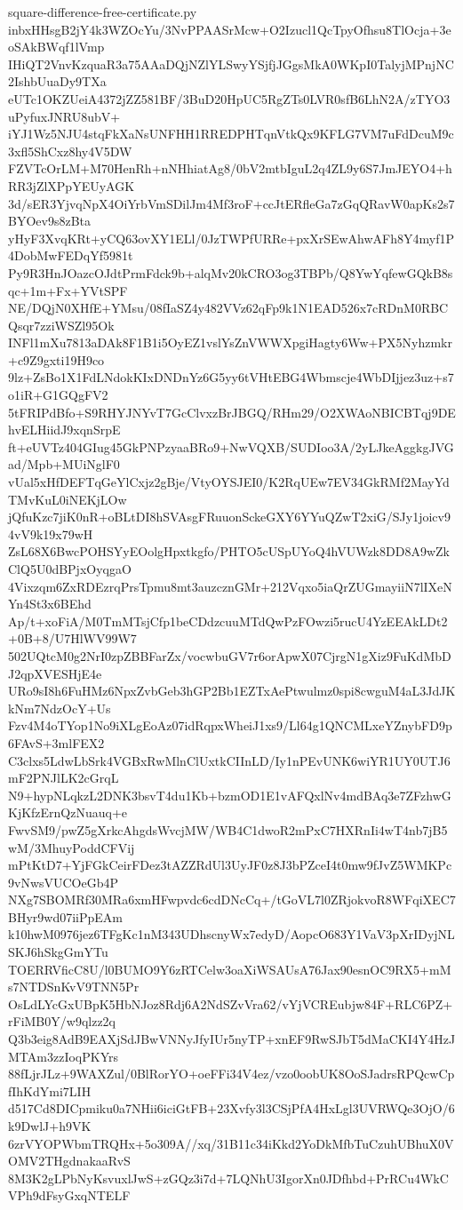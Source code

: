 \documentclass[11pt]{article}
\theoremstyle{definition}
\theoremstyle{remark}
\begin{document}
\begin{filecontents*}[overwrite]{square-difference-free-certificate.py}
inbxHHsgB2jY4k3WZOcYu/3NvPPAASrMcw+O2Izucl1QcTpyOfhsu8TlOcja+3eoSAkBWqf1lVmp
IHiQT2VnvKzquaR3a75AAaDQjNZlYLSwyYSjfjJGgsMkA0WKpI0TalyjMPnjNC2IshbUuaDy9TXa
eUTc1OKZUeiA4372jZZ581BF/3BuD20HpUC5RgZTs0LVR0sfB6LhN2A/zTYO3uPyfuxJNRU8ubV+
iYJ1Wz5NJU4stqFkXaNsUNFHH1RREDPHTqnVtkQx9KFLG7VM7uFdDcuM9c3xfl5ShCxz8hy4V5DW
FZVTcOrLM+M70HenRh+nNHhiatAg8/0bV2mtbIguL2q4ZL9y6S7JmJEYO4+hRR3jZlXPpYEUyAGK
3d/sER3YjvqNpX4OiYrbVmSDilJm4Mf3roF+ccJtERfleGa7zGqQRavW0apKs2s7BYOev9s8zBta
yHyF3XvqKRt+yCQ63ovXY1ELl/0JzTWPfURRe+pxXrSEwAhwAFh8Y4myf1P4DobMwFEDqYf5981t
Py9R3HnJOazcOJdtPrmFdck9b+alqMv20kCRO3og3TBPb/Q8YwYqfewGQkB8sqc+1m+Fx+YVtSPF
NE/DQjN0XHfE+YMsu/08fIaSZ4y482VVz62qFp9k1N1EAD526x7cRDnM0RBCQsqr7zziWSZl95Ok
INFl1mXu7813aDAk8F1B1i5OyEZ1vslYsZnVWWXpgiHagty6Ww+PX5Nyhzmkr+c9Z9gxti19H9co
9lz+ZsBo1X1FdLNdokKIxDNDnYz6G5yy6tVHtEBG4Wbmscje4WbDIjjez3uz+s7o1iR+G1GQgFV2
5tFRIPdBfo+S9RHYJNYvT7GcClvxzBrJBGQ/RHm29/O2XWAoNBICBTqj9DEhvELHiidJ9xqnSrpE
ft+eUVTz404GIug45GkPNPzyaaBRo9+NwVQXB/SUDIoo3A/2yLJkeAggkgJVGad/Mpb+MUiNglF0
vUal5xHfDEFTqGeYlCxjz2gBje/VtyOYSJEI0/K2RqUEw7EV34GkRMf2MayYdTMvKuL0iNEKjLOw
jQfuKzc7jiK0nR+oBLtDI8hSVAsgFRuuonSckeGXY6YYuQZwT2xiG/SJy1joicv94vV9k19x79wH
ZsL68X6BwcPOHSYyEOolgHpxtkgfo/PHTO5cUSpUYoQ4hVUWzk8DD8A9wZkClQ5U0dBPjxOyqgaO
4Vixzqm6ZxRDEzrqPrsTpmu8mt3auzcznGMr+212Vqxo5iaQrZUGmayiiN7lIXeNYn4St3x6BEhd
Ap/t+xoFiA/M0TmMTsjCfp1beCDdzcuuMTdQwPzFOwzi5rucU4YzEEAkLDt2+0B+8/U7HlWV99W7
502UQtcM0g2NrI0zpZBBFarZx/vocwbuGV7r6orApwX07CjrgN1gXiz9FuKdMbDJ2qpXVESHjE4e
URo9sI8h6FuHMz6NpxZvbGeb3hGP2Bb1EZTxAePtwulmz0spi8cwguM4aL3JdJKkNm7NdzOcY+Us
Fzv4M4oTYop1No9iXLgEoAz07idRqpxWheiJ1xs9/Ll64g1QNCMLxeYZnybFD9p6FAvS+3mlFEX2
C3clxs5LdwLbSrk4VGBxRwMlnClUxtkCIInLD/Iy1nPEvUNK6wiYR1UY0UTJ6mF2PNJlLK2cGrqL
N9+hypNLqkzL2DNK3bsvT4du1Kb+bzmOD1E1vAFQxlNv4mdBAq3e7ZFzhwGKjKfzErnQzNuauq+e
FwvSM9/pwZ5gXrkcAhgdsWvcjMW/WB4C1dwoR2mPxC7HXRnIi4wT4nb7jB5wM/3MhuyPoddCFVij
mPtKtD7+YjFGkCeirFDez3tAZZRdUl3UyJF0z8J3bPZceI4t0mw9fJvZ5WMKPc9vNwsVUCOeGb4P
NXg7SBOMRf30MRa6xmHFwpvdc6cdDNcCq+/tGoVL7l0ZRjokvoR8WFqiXEC7BHyr9wd07iiPpEAm
k10hwM0976jez6TFgKc1nM343UDhscnyWx7edyD/AopcO683Y1VaV3pXrIDyjNLSKJ6hSkgGmYTu
TOERRVficC8U/l0BUMO9Y6zRTCelw3oaXiWSAUsA76Jax90esnOC9RX5+mMs7NTDSnKvV9TNN5Pr
OsLdLYcGxUBpK5HbNJoz8Rdj6A2NdSZvVra62/vYjVCREubjw84F+RLC6PZ+rFiMB0Y/w9qlzz2q
Q3b3eig8AdB9EAXjSdJBwVNNyJfyIUr5nyTP+xnEF9RwSJbT5dMaCKI4Y4HzJMTAm3zzIoqPKYrs
88fLjrJLz+9WAXZul/0BlRorYO+oeFFi34V4ez/vzo0oobUK8OoSJadrsRPQcwCpfIhKdYmi7LIH
d517Cd8DICpmiku0a7NHii6iciGtFB+23Xvfy3l3CSjPfA4HxLgl3UVRWQe3OjO/6k9DwlJ+h9VK
6zrVYOPWbmTRQHx+5o309A//xq/31B11c34iKkd2YoDkMfbTuCzuhUBhuX0VOMV2THgdnakaaRvS
8M3K2gLPbNyKsvuxlJwS+zGQz3i7d+7LQNhU3IgorXn0JDfhbd+PrRCu4WkCVPh9dFsyGxqNTELF

\end{filecontents*}
\end{document}
